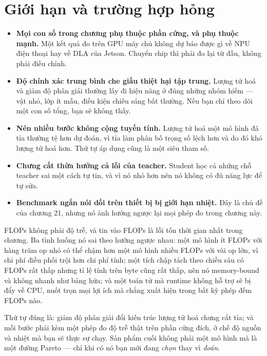\documentclass[../../deep_learning.tex]{subfiles}
\begin{document}
\section{Giới hạn và trường hợp hỏng}
\begin{itemize}
\item \textbf{Mọi con số trong chương phụ thuộc phần cứng, và phụ thuộc mạnh.} Một kết quả đo trên GPU máy chủ không dự báo được gì về NPU điện thoại hay về DLA của Jetson. Chuyển chip thì phải đo lại từ đầu, không phải điều chỉnh.
\item \textbf{Độ chính xác trung bình che giấu thiệt hại tập trung.} Lượng tử hoá và giảm độ phân giải thường lấy đi hiệu năng ở đúng những nhóm hiếm --- vật nhỏ, lớp ít mẫu, điều kiện chiếu sáng bất thường. Nếu bạn chỉ theo dõi một con số tổng, bạn sẽ không thấy.
\item \textbf{Nén nhiều bước không cộng tuyến tính.} Lượng tử hoá một mô hình đã tỉa thường tệ hơn dự đoán, vì tỉa làm phân bố trọng số lệch hơn và do đó khó lượng tử hoá hơn. Thứ tự áp dụng cũng là một siêu tham số.
\item \textbf{Chưng cất thừa hưởng cả lỗi của teacher.} Student học cả những chỗ teacher sai một cách tự tin, và vì nó nhỏ hơn nên nó không có đủ năng lực để tự sửa.
\item \textbf{Benchmark ngắn nói dối trên thiết bị bị giới hạn nhiệt.} Đây là chủ đề của chương 21, nhưng nó ảnh hưởng ngược lại mọi phép đo trong chương này.
\end{itemize}

\begin{cambay}
FLOPs không phải độ trễ, và tin vào FLOPs là lỗi tốn thời gian nhất trong chương. Ba tình huống nó sai theo hướng ngược nhau: một mô hình ít FLOPs với hàng trăm op nhỏ có thể chậm hơn một mô hình nhiều FLOPs với vài op lớn, vì chi phí điều phối trội hơn chi phí tính; một tích chập tách theo chiều sâu có FLOPs rất thấp nhưng tỉ lệ tính trên byte cũng rất thấp, nên nó memory-bound và không nhanh như bảng hứa; và một toán tử mà runtime không hỗ trợ sẽ bị đẩy về CPU, nuốt trọn mọi lợi ích mà chẳng xuất hiện trong bất kỳ phép đếm FLOPs nào.
\end{cambay}

\begin{cannho}
Thứ tự đúng là: giảm độ phân giải \ra đổi kiến trúc \ra lượng tử hoá \ra chưng cất \ra tỉa; và mỗi bước phải kèm một phép đo độ trễ thật trên phần cứng đích, ở chế độ nguồn và nhiệt mà bạn sẽ thực sự chạy. Sản phẩm cuối không phải một mô hình mà là một đường Pareto --- chỉ khi có nó bạn mới đang \emph{chọn} thay vì \emph{đoán}. 
\end{cannho}
\end{document}
